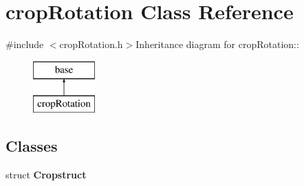 \hypertarget{classcrop_rotation}{
\section{cropRotation Class Reference}
\label{classcrop_rotation}
}


{\ttfamily \#include $<$cropRotation.h$>$}Inheritance diagram for cropRotation::\begin{figure}[H]
\begin{center}
\leavevmode
\includegraphics[height=2cm]{classcrop_rotation}
\end{center}
\end{figure}
\subsection*{Classes}
\begin{DoxyCompactItemize}
\item 
struct {\bfseries Cropstruct}
\end{DoxyCompactItemize}
